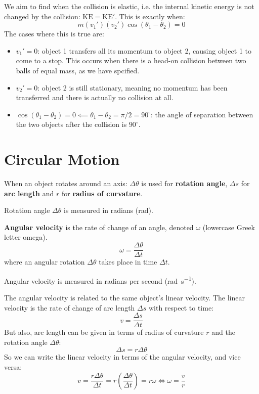 \documentclass{article}
\newcommand{\definition}[1]{\begin{tcolorbox}[colback=red!5!white,colframe=red!75!black,parbox=false] #1 \end{tcolorbox}}
\begin{document}
We aim to find when the collision is elastic, i.e. the internal kinetic energy is not changed by the collision: $\text{KE}=\text{KE}'$. This is exactly when:
\begin{equation*}
    m(v_1')(v_2')\cos(\theta_1-\theta_2)=0
\end{equation*}
The cases where this is true are:
\begin{itemize}
    \item $v_1'=0$: object 1 transfers all its momentum to object 2, causing object 1 to come to a stop. This occurs when there is a head-on collision between two balls of equal mass, as we have spcified.
	\item $v_2'=0$: object 2 is still stationary, meaning no momentum has been transferred and there is actually no collision at all.
	\item $\cos(\theta_1-\theta_2)=0 \impliedby \theta_1-\theta_2=\pi/2=90^\circ$: the angle of separation between the two objects after the collision is $90^\circ$.
\end{itemize}

\section{Circular Motion}

\definition{When an object rotates around an axis: $\Delta \theta$ is used for \textbf{rotation angle}, $\Delta s$ for \textbf{arc length} and $r$ for \textbf{radius of curvature}.}

Rotation angle $\Delta \theta$ is measured in radians (\si{rad}).

\definition{\textbf{Angular velocity} is the rate of change of an angle, denoted $\omega$ (lowercase Greek letter omega).
\begin{equation*}
    \omega=\frac{\Delta \theta}{\Delta t}
\end{equation*}
where an angular rotation $\Delta \theta$ takes place in time $\Delta t$.}

Angular velocity is measured in radians per second (\si{\radian\per\second}).

The angular velocity is related to the same object's linear velocity. The linear velocity is the rate of change of arc length $\Delta s$ with respect to time:
\begin{equation*}
    v=\frac{\Delta s}{\Delta t}
\end{equation*}
But also, arc length can be given in terms of radius of curvature $r$ and the rotation angle $\Delta \theta$:
\begin{equation*}
    \Delta s=r\Delta\theta
\end{equation*}
So we can write the linear velocity in terms of the angular velocity, and vice versa:
\begin{equation*}
    v=\frac{r\Delta \theta}{\Delta t}=r \left( \frac{\Delta\theta}{\Delta t} \right)=r\omega
	\iff 
	\omega=\frac{v}{r}
\end{equation*}
\end{document}
